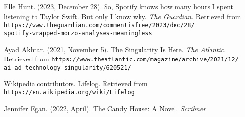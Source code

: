 \documentclass[11pt]{article}
\begin{document}



\begin{thebibliography}{3}
Elle Hunt. (2023, December 28). So, Spotify knows how many hours I spent listening to Taylor Swift. But only I know why. \textit{The Guardian}. Retrieved from \texttt{https://www.theguardian.com/commentisfree/2023/dec/28/\\spotify-wrapped-monzo-analyses-meaningless}

Ayad Akhtar. (2021, November 5). The Singularity Is Here. \textit{The Atlantic}. Retrieved from \texttt{https://www.theatlantic.com/magazine/archive/2021/12/\\ai-ad-technology-singularity/620521/}

Wikipedia contributors. Lifelog. Retrieved from \texttt{https://en.wikipedia.org/wiki/Lifelog}

Jennifer Egan. (2022, April). The Candy House: A Novel.
\textit{Scribner}
\end{thebibliography}

\vspace{2cm}
\end{document}
